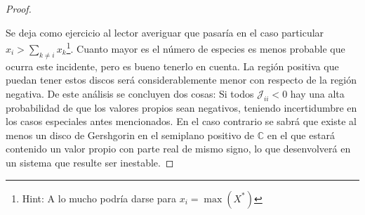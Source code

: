 \begin{proposición}
\begin{proof}
\begin{itemize}
		\end{itemize}
		Se deja como ejercicio al lector averiguar que pasaría en el caso particular $x_i>\sum_{k\neq i}x_k$\footnote{Hint: A lo mucho podría darse para $x_i=\max(X^*)$}. Cuanto mayor es el número de especies es menos probable que ocurra este incidente, pero es bueno tenerlo en cuenta. La región positiva que puedan tener estos discos será considerablemente menor con respecto de la región negativa. De este análisis se concluyen dos cosas: Si todos $\mathcal{J}_{ii}<0$ hay una alta probabilidad de que los valores propios sean negativos, teniendo incertidumbre en los casos especiales antes mencionados. En el caso contrario se sabrá que existe al menos un disco de Gershgorin en el semiplano positivo de $\mathbb{C}$ en el que estará contenido un valor propio con parte real de mismo signo, lo que desenvolverá en un sistema que resulte ser inestable.
	\end{proof}
\end{proposición}

